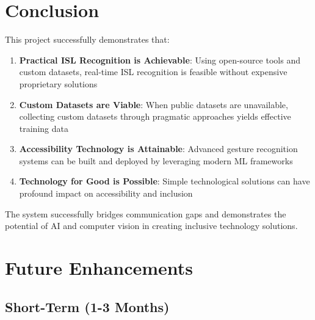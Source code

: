 \section{Conclusion}

This project successfully demonstrates that:

\begin{enumerate}
    \item \textbf{Practical ISL Recognition is Achievable}: Using open-source tools and custom datasets, real-time ISL recognition is feasible without expensive proprietary solutions
    
    \item \textbf{Custom Datasets are Viable}: When public datasets are unavailable, collecting custom datasets through pragmatic approaches yields effective training data
    
    \item \textbf{Accessibility Technology is Attainable}: Advanced gesture recognition systems can be built and deployed by leveraging modern ML frameworks
    
    \item \textbf{Technology for Good is Possible}: Simple technological solutions can have profound impact on accessibility and inclusion
\end{enumerate}

The system successfully bridges communication gaps and demonstrates the potential of AI and computer vision in creating inclusive technology solutions.

\section{Future Enhancements}

\subsection{Short-Term (1-3 Months)}


